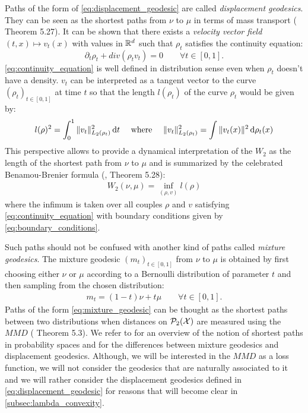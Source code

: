 Paths of the form of \cref{eq:displacement_geodesic} are called \textit{displacement geodesics}. They can be seen as the shortest paths from $\nu$ to $\mu$ in terms of mass transport (\cite{Santambrogio:2015} Theorem 5.27). It can be shown that there exists a \textit{velocity vector field} $(t,x)\mapsto v_t(x)$ with values in ${{\mathbb R}}^d$ such that $\rho_t$ satisfies the continuity equation:
\begin{equation}\label{eq:continuity_equation}
\partial_t \rho_t + div(\rho_t v_t ) = 0 \qquad \forall t\in[0,1].
\end{equation}
\cref{eq:continuity_equation} is well defined in distribution sense even when $\rho_t$ doesn't have a density. $v_t$ can be interpreted as a tangent vector to the curve $(\rho_t)_{t\in[0,1]}$ at time $t$ so that the length $l(\rho_t)$ of the curve $\rho_t$ would be given by:
\begin{equation}
l(\rho)^2 = \int_0^1 \Vert v_t \Vert^2_{L_2(\rho_t)} \mathop{}\!\mathrm{d} t \quad \text{ where } \quad 
\Vert v_t \Vert^2_{L_2(\rho_t)} =  \int \Vert v_t(x) \Vert^2 \mathop{}\!\mathrm{d} \rho_t(x)
\end{equation}
This perspective allows to provide a dynamical interpretation of the $W_2$ as the length  of the shortest path from $\nu$ to $\mu$ and is summarized by the celebrated Benamou-Brenier formula (\cite{Santambrogio:2015}, Theorem 5.28):
\begin{align}\label{eq:benamou-brenier-formula}
W_2(\nu,\mu) = \inf_{(\rho,v)} l(\rho)
\end{align}
where the infimum is taken  over all couples  $\rho$ and $v$ satisfying  \cref{eq:continuity_equation}  with boundary conditions given by \cref{eq:boundary_conditions}.

\begin{remark}
	Such paths should not be confused with another kind of paths called \textit{mixture geodesics}. The mixture geodesic $(m_t)_{t\in[0,1]}$ from $\nu$ to $\mu$ is obtained by first choosing either $\nu$ or $\mu$ according to a Bernoulli distribution of parameter $t$ and then sampling from the chosen distribution:
	\begin{align}\label{eq:mixture_geodesic}
	m_t = (1-t)\nu + t\mu \qquad \forall t \in [0,1].
	\end{align}
	Paths of the form \cref{eq:mixture_geodesic} can be thought as the shortest paths between two distributions when distances on $\mathcal{P}_2({{\mathcal X}})$ are measured using the $MMD$ (\cite{Bottou:2017} Theorem 5.3). We refer to \cite{Bottou:2017} for an overview of the notion of shortest paths in probability spaces and for the differences between mixture geodesics and displacement geodesics.
	Although, we will be interested in the $MMD$ as a loss function, we will not consider the geodesics that are naturally associated to it and we will rather consider the displacement geodesics defined in \cref{eq:displacement_geodesic} for reasons that will become clear in \cref{subsec:lambda_convexity}.
\end{remark}

